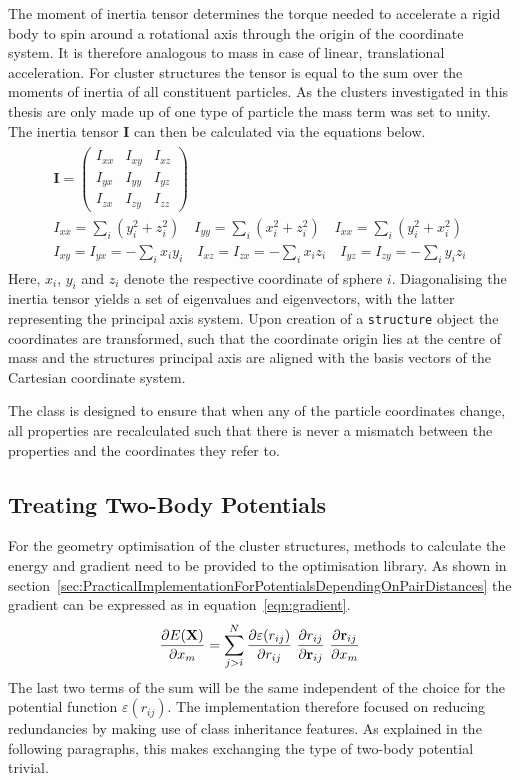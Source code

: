 The moment of inertia tensor determines the torque needed to accelerate a rigid
body to spin around a rotational axis through the origin of the coordinate
system. It is therefore analogous to mass in case of linear, translational
acceleration. For cluster structures the tensor is equal to the sum over the
moments of inertia of all constituent particles. As the clusters investigated in
this thesis are only made up of one type of particle the mass term was set to
unity. The inertia tensor $\mathbf{I}$ can then be calculated via the equations
below.
%
\begin{gather}
    \begin{gathered}
    \mathbf{I}=
    \begin{pmatrix}
        I_{xx} & I_{xy} & I_{xz}\\
        I_{yx} & I_{yy} & I_{yz}\\
        I_{zx} & I_{zy} & I_{zz}
    \end{pmatrix}\\
    I_{xx}=\sum_i(y_i^2+z_i^2) \quad I_{yy}=\sum_i(x_i^2+z_i^2) \quad I_{xx}=\sum_i(y_i^2+x_i^2)\\
    I_{xy} = I_{yx} = -\sum_ix_iy_i \quad I_{xz} = I_{zx} = -\sum_ix_iz_i \quad I_{yz} = I_{zy} = -\sum_iy_iz_i
    \end{gathered}
\end{gather}
%
Here, $x_i$, $y_i$ and $z_i$ denote the respective coordinate of sphere $i$.
Diagonalising the inertia tensor yields a set of eigenvalues and eigenvectors,
with the latter representing the principal axis system. Upon creation of a
\verb|structure| object the coordinates are transformed, such that the
coordinate origin lies at the centre of mass and the structures principal axis
are aligned with the basis vectors of the Cartesian coordinate system.

The class is designed to ensure that when any of the particle coordinates
change, all properties are recalculated such that there is never a mismatch
between the properties and the coordinates they refer to.


\subsection{Treating Two-Body Potentials}
\label{sec:thepairpotentialclass}

For the geometry optimisation of the cluster structures, methods to calculate the
energy and gradient need to be provided to the optimisation library. As shown in
section~\ref{sec:PracticalImplementationForPotentialsDependingOnPairDistances}
the gradient can be expressed as in equation~\eqref{eqn:gradient}.
%
\begin{align}
    \pdv{E(\mathbf{X})}{x_m}=\sum_{j>i}^N\pdv{\varepsilon(r_{ij})}{r_{ij}}\ \pdv{r_{ij}}{\mathbf{r}_{ij}}\ \pdv{\mathbf{r}_{ij}}{x_m}\label{eqn:gradient}
\end{align}
%
The last two terms of the sum will be the same independent of the choice for the
potential function $\varepsilon(r_{ij})$. The implementation therefore 
focused on reducing redundancies by making use of class inheritance features. As
explained in the following paragraphs, this makes exchanging the type of
two-body potential trivial.

